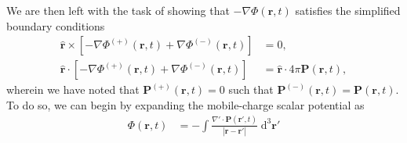 \documentclass{article}
\begin{document}
We are then left with the task of showing that $-\nabla\Phi(\mathbf{r},t)$ satisfies the simplified boundary conditions
\begin{equation}
\begin{split}
\hat{\mathbf{r}}\times\left[-\nabla\Phi^{(+)}(\mathbf{r},t) + \nabla\Phi^{(-)}(\mathbf{r},t)\right] &= 0,\\
\hat{\mathbf{r}}\cdot\left[-\nabla\Phi^{(+)}(\mathbf{r},t) + \nabla\Phi^{(-)}(\mathbf{r},t)\right] &= \hat{\mathbf{r}}\cdot4\pi\mathbf{P}(\mathbf{r},t),
\end{split}
\end{equation}
wherein we have noted that $\mathbf{P}^{(+)}(\mathbf{r},t) = 0$ such that $\mathbf{P}^{(-)}(\mathbf{r},t) = \mathbf{P}(\mathbf{r},t)$. To do so, we can begin by expanding the mobile-charge scalar potential as
\begin{equation}
\begin{split}
\Phi(\mathbf{r},t) &= -\int\frac{\nabla'\cdot\mathbf{P}(\mathbf{r}',t)}{|\mathbf{r} - \mathbf{r}'|}\;\mathrm{d}^3\mathbf{r}'\\

\end{split}
\end{equation}
\end{document}
